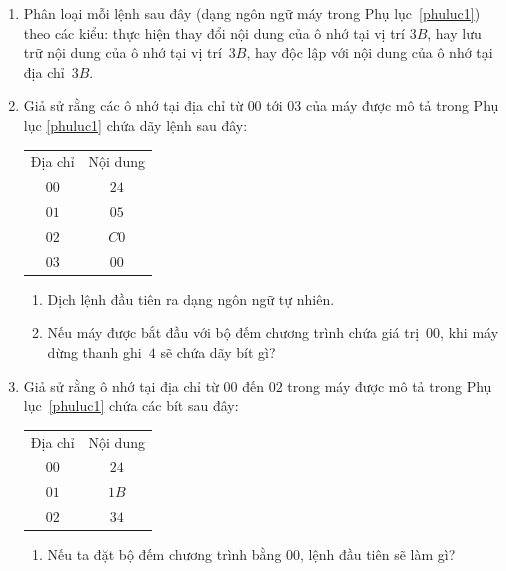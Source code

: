 \begin{multicols}{2}
\begin{enumerate}
  \item Phân loại mỗi lệnh sau đây (dạng ngôn ngữ máy trong Phụ lục~\ref{phuluc1}) theo
    các kiểu: thực hiện thay đổi nội dung của ô nhớ tại vị trí $3B$, hay lưu trữ nội dung
    của ô nhớ tại vị trí~$3B$, hay độc lập với nội dung của ô nhớ tại địa chỉ~$3B$.


  \item Giả sử rằng các ô nhớ tại địa chỉ từ $00$ tới $03$ của máy được mô tả trong Phụ
    lục \ref{phuluc1} chứa dãy lệnh sau đây:

    \begin{tabular}{cc}
      Địa chỉ & Nội dung \\
      $00$    & $24$     \\
      $01$    & $05$     \\
      $02$    & $C0$     \\
      $03$    & $00$     
    \end{tabular}

    \begin{enumerate}
    \item Dịch lệnh đầu tiên ra dạng ngôn ngữ tự nhiên.

    \item Nếu máy được bắt đầu với bộ đếm chương trình chứa giá trị~$00$, khi máy dừng
      thanh ghi~$4$ sẽ chứa dãy bít gì?
    \end{enumerate}

  \item Giả sử rằng ô nhớ tại địa chỉ từ $00$ đến $02$ trong máy được mô tả trong Phụ
    lục~\ref{phuluc1} chứa các bít sau đây:

    \begin{tabular}{cc}
      Địa chỉ & Nội dung \\
      $00$    & $24$     \\
      $01$    & $1B$     \\
      $02$    & $34$     
    \end{tabular}

    \begin{enumerate}
    \item Nếu ta đặt bộ đếm chương trình bằng $00$, lệnh đầu tiên sẽ làm gì?


\end{enumerate}
\end{enumerate}
\end{multicols}
